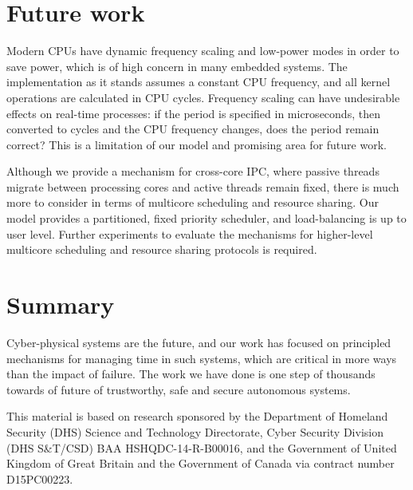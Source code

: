 \section{Future work}

Modern \glspl{CPU} have dynamic frequency scaling and low-power modes in order to save power, which
is of high concern in many embedded systems. The implementation as it stands assumes a constant
\gls{CPU} frequency, and all kernel operations are calculated in \gls{CPU} cycles. Frequency scaling
can have undesirable effects on real-time processes: if the period is specified in microseconds, then
converted to cycles and the CPU frequency changes, does the period remain correct? This is a
limitation of our model and promising area for future work.

Although we provide a mechanism for cross-core IPC, where passive threads migrate between processing
cores and active threads remain fixed, there is much more to consider in terms of multicore
scheduling and resource sharing. Our model provides a partitioned, fixed priority scheduler, and 
load-balancing is up to user level. Further experiments to evaluate the mechanisms for higher-level
multicore scheduling and resource sharing protocols is required. 
                
\section{Summary}

Cyber-physical systems are the future, and our work has focused on principled mechanisms for
managing time in such systems, which are critical in more ways than the impact of failure. The work
we have done is one step of thousands towards of future of trustworthy, safe and secure
autonomous systems. 

This material is based on research sponsored by the Department of Homeland Security (DHS) Science
and Technology Directorate, Cyber Security Division (DHS S\&T/CSD) BAA HSHQDC-14-R-B00016, and the
Government of United Kingdom of Great Britain and the Government of Canada via contract number
D15PC00223. 
